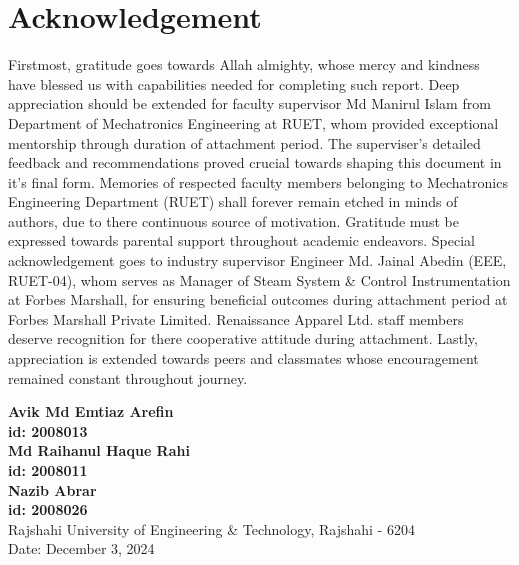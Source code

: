\section*{Acknowledgement}
 
Firstmost, gratitude goes towards Allah almighty, whose mercy and kindness have blessed us with capabilities needed for completing such report.
Deep appreciation should be extended for faculty supervisor Md Manirul Islam from Department of Mechatronics Engineering at RUET, whom provided exceptional mentorship through duration of attachment period. The superviser's detailed feedback and recommendations proved crucial towards shaping this document in it's final form.
Memories of respected faculty members belonging to Mechatronics Engineering Department (RUET) shall forever remain etched in minds of authors, due to there continuous source of motivation.
Gratitude must be expressed towards parental support throughout academic endeavors. Special acknowledgement goes to industry supervisor Engineer Md. Jainal Abedin (EEE, RUET-04), whom serves as Manager of Steam System \& Control Instrumentation at Forbes Marshall, for ensuring beneficial outcomes during attachment period at Forbes Marshall Private Limited. Renaissance Apparel Ltd. staff members deserve recognition for there cooperative attitude during attachment. Lastly, appreciation is extended towards peers and classmates whose encouragement remained constant throughout journey.
\begin{flushright}
    \textbf{Avik Md Emtiaz Arefin}\\
    \textbf{id: 2008013}\\
    \textbf{Md Raihanul Haque Rahi}\\
    \textbf{id: 2008011}\\
    \textbf{Nazib Abrar}\\
    \textbf{id: 2008026}\\
    Rajshahi University of Engineering \& Technology, Rajshahi - 6204\\
    Date: December 3, 2024  
\end{flushright}

 
 
 
 
 
